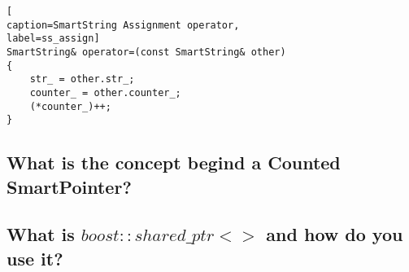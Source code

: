 \derp

\begin{lstlisting}[
caption=SmartString Assignment operator,
label=ss_assign]
SmartString& operator=(const SmartString& other)
{
	str_ = other.str_;
	counter_ = other.counter_;
	(*counter_)++;
}
\end{lstlisting}

\subsection{What is the concept begind a Counted SmartPointer?}

\subsection{What is $boost::shared\_ptr<>$ and how do you use it?}
